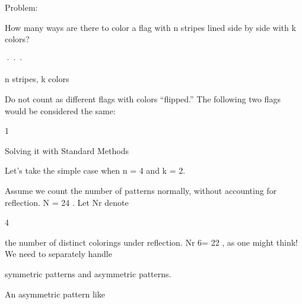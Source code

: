 \documentclass[a4paper,portrait,12pt]{article}
\begin{document}
\begin{flushleft}
Problem:
\end{flushleft}


\begin{flushleft}
How many ways are there to color a flag with n stripes lined side by side with k colors?
\end{flushleft}


···


\begin{flushleft}
n stripes, k colors
\end{flushleft}





\begin{flushleft}
Do not count as different flags with colors {``}flipped.'' The following two flags would be considered the same:
\end{flushleft}





1










\begin{flushleft}
Solving it with Standard Methods
\end{flushleft}





\begin{flushleft}
Let's take the simple case when n = 4 and k = 2.
\end{flushleft}


\begin{flushleft}
Assume we count the number of patterns normally, without accounting for reflection. N = 24 . Let Nr denote
\end{flushleft}


4


\begin{flushleft}
the number of distinct colorings under reflection. Nr 6= 22 , as one might think! We need to separately handle
\end{flushleft}


\begin{flushleft}
symmetric patterns and asymmetric patterns.
\end{flushleft}


\begin{flushleft}
An asymmetric pattern like
\end{flushleft}
\end{document}
